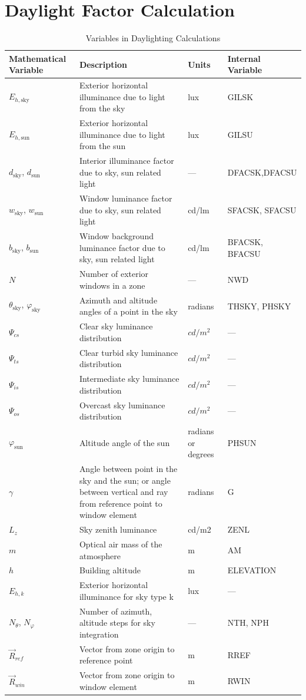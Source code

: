 \section{Daylight Factor Calculation}\label{daylight-factor-calculation}

\begin{longtable}[c]{p{1.25in}p{2.0in}p{1.25in}p{1.5in}}
\caption{Variables in Daylighting Calculations \label{table:variables-in-daylighting-calculations}}\\
\toprule 
Mathematical Variable & Description & Units & Internal Variable \tabularnewline \midrule \endhead
$E_{h,\text{sky}}$ & Exterior horizontal illuminance due to light from the sky & lux & GILSK \tabularnewline
$E_{h,\text{sun}}$ & Exterior horizontal illuminance due to light from the sun & lux & GILSU \tabularnewline
$d_{\text{sky}}$, $d_{\text{sun}}$ & Interior illuminance factor due to sky, sun related light & --- & DFACSK,DFACSU \tabularnewline
$w_{\text{sky}}$, $w_{\text{sun}}$ & Window luminance factor due to sky, sun related light & cd/lm & SFACSK, SFACSU \tabularnewline
$b_{\text{sky}}$, $b_{\text{sun}}$ & Window background luminance factor due to sky, sun related light & cd/lm & BFACSK, BFACSU \tabularnewline
$N$ & Number of exterior windows in a zone & --- & NWD \tabularnewline
$\theta_{\text{sky}}$, $\varphi_{\text{sky}}$ & Azimuth and altitude angles of a point in the sky & radians & THSKY, PHSKY \tabularnewline
$\Psi_{cs}$ & Clear sky luminance distribution & $cd/m^2$ & --- \tabularnewline
$\Psi_{ts}$ & Clear turbid sky luminance distribution & $cd/m^2$ & --- \tabularnewline
$\Psi_{is}$ & Intermediate sky luminance distribution & $cd/m^2$ & --- \tabularnewline
$\Psi_{os}$ & Overcast sky luminance distribution & $cd/m^2$ & --- \tabularnewline
$\varphi_{\text{sun}}$ & Altitude angle of the sun & radians or degrees & PHSUN \tabularnewline
$\gamma$ & Angle between point in the sky and the sun; or angle between vertical and ray from reference point to window element & radians & G \tabularnewline
$L_z$ & Sky zenith luminance & cd/m2 & ZENL \tabularnewline
$m$ & Optical air mass of the atmosphere & m & AM \tabularnewline
$h$ & Building altitude & m & ELEVATION \tabularnewline
$E_{h,k}$ & Exterior horizontal illuminance for sky type k & lux & --- \tabularnewline
$N_{\theta}$, $N_{\varphi}$ & Number of azimuth, altitude steps for sky integration & --- & NTH, NPH \tabularnewline
$\vec{R}_{ref}$ & Vector from zone origin to reference point & m & RREF \tabularnewline
$\vec{R}_{win}$ & Vector from zone origin to window element & m & RWIN \tabularnewline

\end{longtable}
